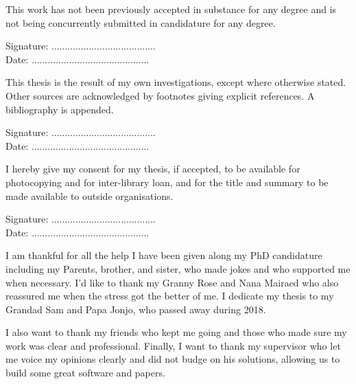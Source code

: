 \begin{declaration}
This work has not been previously accepted in substance for any degree and is not being concurrently submitted in candidature for any degree.
  \vspace*{0.5cm}
  \begin{flushright}
    Signature: ....................................... \\ \vspace{0.3cm}
    Date: ............................................
  \end{flushright}
  \vspace*{1cm}
  
  This thesis is the result of my own investigations, except where otherwise stated. Other sources are acknowledged by footnotes giving explicit references. A bibliography is appended.
  \vspace*{0.5cm}
  \begin{flushright}
    Signature: ....................................... \\ \vspace{0.3cm}
    Date: ............................................
  \end{flushright}
  \vspace*{1cm}
  
   I hereby give my consent for my thesis, if accepted, to be available for photocopying and for inter-library loan, and for the title and summary to be made available to outside organisations.
  \vspace*{0.5cm}
  \begin{flushright}
    Signature: ....................................... \\ \vspace{0.3cm}
    Date: ............................................
  \end{flushright}
\end{declaration}



\begin{acknowledgements}
  I am thankful for all the help I have been given along my PhD candidature including my Parents, brother, and sister, who made jokes and who supported me when necessary. I'd like to thank my Granny Rose and Nana Mairaed who also reassured me when the stress got the better of me. I dedicate my thesis to my Grandad Sam and Papa Jonjo, who passed away during 2018.
  
I also want to thank my friends who kept me going and those who made sure my work was clear and professional. Finally, I want to thank my supervisor who let me voice my opinions clearly and did not budge on his solutions, allowing us to build some great software and papers. 
\end{acknowledgements}


